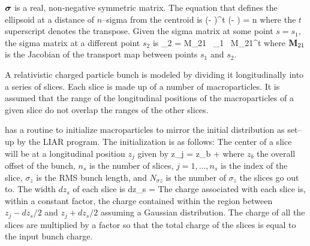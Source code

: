 $\boldsymbol{\sigma}$ is a real, non-negative symmetric matrix. The equation that
defines the ellipsoid at a distance of $n$--sigma from the centroid is
\Begineq
  (\bfr - \bfrbar)^t \bfsigma\inv (\bfr - \bfrbar) = n
\Endeq
where the $t$ superscript denotes the transpose. Given the sigma matrix
at some point $s = s_1$, the sigma matrix at a different point $s_2$ is
\Begineq
  \bfsigma_2 = \Bf M_{21} \, \bfsigma_1 \, \Bf M_{21}^t
\Endeq
where ${\bf M}_{21}$ is the Jacobian of the transport map between points
$s_1$ and $s_2$.

A relativistic charged particle bunch is modeled by dividing it longitudinally
into a series
of slices. Each slice is made up of a number of macroparticles. It is assumed
that the range of the longitudinal positions of the macroparticles of a given
slice do not overlap the ranges of the other slices. 

\bmad has a routine to initialize macroparticles to mirror the initial
distribution as set--up by the LIAR program\cite{b:liar}. The
initialization is as follows: The center of a
slice will be at a longitudinal position $z_j$ given by
\Begineq
  z_j = z_b + 
\Endeq
where $z_b$ the overall offset of the bunch, 
$n_s$ is the number of slices, $j = 1, \ldots,
n_s$ is the index of the slice, $\sigma_z$ is the RMS bunch length,
and $N_{\sigma z}$ is the number of $\sigma_z$ the slices go out
to. The width $dz_s$ of each slice is
\Begineq
    dz_s = 
\Endeq
The charge associated with each slice is, within a constant factor,
the charge contained within the region between $z_j - dz_s/2$ and $z_j
+ dz_s/2$ assuming a Gaussian distribution.  The charge of all the
slices are multiplied by a factor so that the total charge of the
slices is equal to the input bunch charge.

